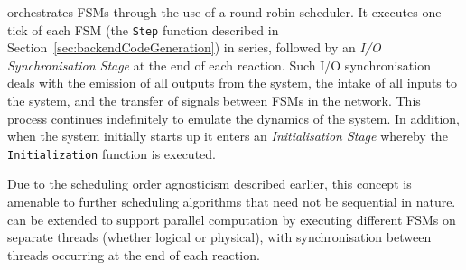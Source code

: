 \ourTool orchestrates \acp{FSM} through the use of a round-robin
scheduler.  It executes one tick of each \ac{FSM} (the \texttt{Step} function 
described in Section~\ref{sec:backendCodeGeneration}) in series, followed by an 
\emph{I/O Synchronisation Stage} at the end of each reaction.  Such I/O 
synchronisation deals with the emission of all outputs from the system, the 
intake of all inputs to the system, and the transfer of signals between 
\acp{FSM} in the network.  This process continues indefinitely to emulate the 
dynamics of the system.  In addition, when the system initially starts up it 
enters an \emph{Initialisation Stage} whereby the \texttt{Initialization} 
function is executed.

Due to the scheduling order agnosticism described earlier, this concept is 
amenable to further scheduling algorithms that need not be sequential in 
nature.  \ourTool can be extended to support parallel computation by executing 
different \acp{FSM} on separate threads (whether logical or physical), with 
synchronisation between threads occurring at the end of each reaction.
